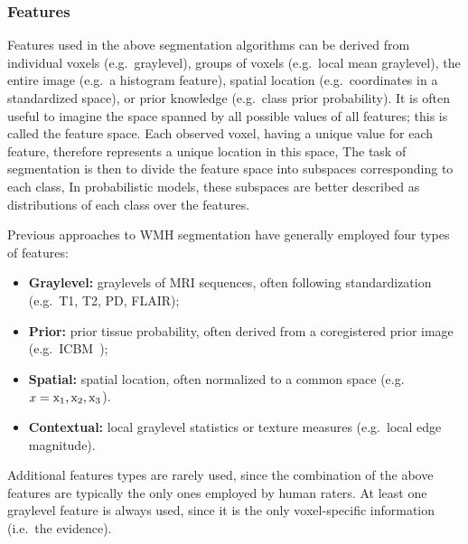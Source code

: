 \subsubsection{Features}\label{sss:prior-feats}
Features used in the above segmentation algorithms can be derived from
individual voxels (e.g.\ graylevel),
groups of voxels (e.g.\ local mean graylevel),
the entire image (e.g.\ a histogram feature),
spatial location (e.g.\ coordinates in a standardized space), or
prior knowledge (e.g.\ class prior probability).
It is often useful to imagine the space spanned by all possible values of all features;
this is called the feature space.
Each observed voxel, having a unique value for each feature,
therefore represents a unique location in this space,
The task of segmentation is then to divide the feature space into
subspaces corresponding to each class,
In probabilistic models,
these subspaces are better described as distributions of each class over the features.
\par
Previous approaches to WMH segmentation have generally employed four types of features:
\begin{itemize}
  \item \textbf{Graylevel:}
  graylevels of MRI sequences, often following standardization
  (e.g.\ T1, T2, PD, FLAIR);
  \item \textbf{Prior:}
  prior tissue probability, often derived from a coregistered prior image
  (e.g.\ ICBM~\cite{Mazziotta2001});
  \item \textbf{Spatial:}
  spatial location, often normalized to a common space
  (e.g.\ $x = \mathrm{x}_1,\mathrm{x}_2,\mathrm{x}_3$).
  \item \textbf{Contextual:}
  local graylevel statistics or texture measures
  (e.g.\ local edge magnitude).
\end{itemize}
Additional features types are rarely used,
since the combination of the above features are typically the only ones employed by human raters.
At least one graylevel feature is always used,
since it is the only voxel-specific information (i.e.\ the evidence).
